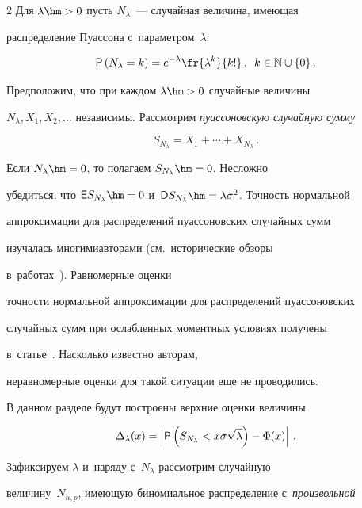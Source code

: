 \begin{multicols}{2}
Для $\lambda\hm>0$ пусть $N_{\lambda}$~--- случайная величина, имеющая


распределение Пуассона с~параметром~$\lambda$:


$$


{\sf P}\left(N_{\lambda}=k\right)=e^{-\lambda}\fr{\lambda^k}{k!}\,,\enskip


k\in\mathbb{N}\cup \{0\}\,.


$$


Предположим, что при каждом $\lambda\hm>0$ случайные величины


$N_{\lambda},X_1,X_2,\ldots$ независимы. Рассмотрим \textit{пуассоновскую случайную сумму}


$$


S_{N_{\lambda}}=X_1+\cdots+X_{N_{\lambda}}\,.


$$


Если $N_{\lambda}\hm=0$, то полагаем $S_{N_{\lambda}}\hm=0$. Несложно


убедиться, что ${\sf E}S_{N_{\lambda}}\hm=0$ и~${\sf D}S_{N_{\lambda}}\hm=


\lambda\sigma^2$. Точность нормальной


аппроксимации для рас\-пре\-де\-лений пуассоновских случайных сумм


изучалась многими\linebreak автора\-ми (см.\ исторические обзоры 


в~рабо\-тах~\cite{KorolevShevtsova, ShevtsovaPoisson}). Равномерные оценки


точности нормальной аппроксимации для распределений пуассоновских


случайных сумм при ослабленных моментных условиях получены 


в~статье~\cite{KorolevDorofeevaLMJ}. Насколько известно авторам,


неравномерные оценки для такой ситуации еще не проводились.





В данном разделе будут построены верхние оценки величины


$$


\Delta_{\lambda}(x)=\left\vert {\sf P}\left(S_{N_{\lambda}}<x\sigma


\sqrt{\lambda}\right)-\Phi(x)\right\vert\,.


$$


Зафиксируем $\lambda$ и~наряду с~$N_{\lambda}$ рассмотрим случайную


величину~$N_{n,p}$, имеющую биномиальное распределение с~\textit{произвольной} 



\end{multicols}
